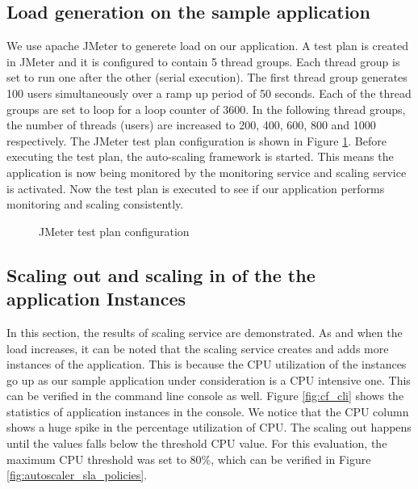\documentclass[article,type=msc,colorback,12pt,accentcolor=tud8b,table]{tudthesis}
\begin{document}
	\subsection{Load generation on the sample application}
	
 We use apache JMeter to generete load on our application. A test plan is created in JMeter and it is configured to contain 5 thread groups. Each thread group is set to run one after the other (serial execution). The first thread group generates 100 users simultaneously over a ramp up period of 50 seconds. Each of the thread groups are set to loop for a loop counter of 3600. In the following thread groups, the number of threads (users) are increased to 200, 400, 600, 800 and 1000 respectively. The JMeter test plan configuration is shown in Figure \ref{fig:jmeter_testplan}. Before executing the test plan, the auto-scaling framework is started. This means the application is now being monitored by the monitoring service and scaling service is activated. Now the test plan is executed to see if our application performs monitoring and scaling consistently.
 
  \begin{figure}[h]
  	\begin{center}
  		\makebox[\textwidth]{\texttt{[image: E3]}}
  	\end{center}
  	\caption{JMeter test plan configuration}
  	\label{fig:jmeter_testplan}
  \end{figure}
	
	\subsection{Scaling out and scaling in of the the application Instances}
		
	In this section, the results of scaling service are demonstrated. As and when the load increases, it can be noted that the scaling service creates and adds more instances of the application. This is because the CPU utilization of the instances go up as our sample application under consideration is a CPU intensive one. This can be verified in the command line console as well. Figure \ref{fig:cf_cli} shows the statistics of application instances in the console. We notice that the CPU column shows a huge spike in the percentage utilization of CPU. The scaling out happens until the values falls below the threshold CPU value. For this evaluation, the maximum CPU threshold was set to 80\%, which can be verified in Figure \ref{fig:autoscaler_sla_policies}.
	
\end{document}
